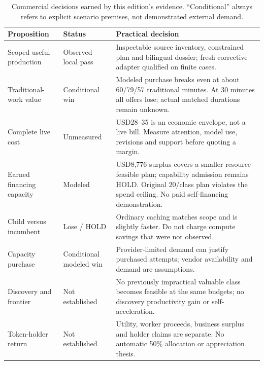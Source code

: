 \begin{table}[H]\small\begin{tabularx}{\linewidth}{p{.21\linewidth}p{.19\linewidth}X}\toprule Proposition & Status & Practical decision \\\midrule
Scoped useful production & Observed local pass & Inspectable source inventory, constrained plan and bilingual dossier; fresh corrective adapter qualified on finite cases. \\
Traditional-work value & Conditional win & Modeled purchase breaks even at about 60/79/57 traditional minutes. At 30 minutes all offers lose; actual matched durations remain unknown. \\
Complete live cost & Unmeasured & USD28--35 is an economic envelope, not a live bill. Measure attention, model use, revisions and support before quoting a margin. \\
Earned financing capacity & Modeled & USD8,776 surplus covers a smaller resource-feasible plan; capability admission remains HOLD. Original 20/class plan violates the spend ceiling. No paid self-financing demonstration. \\
Child versus incumbent & Lose / HOLD & Ordinary caching matches scope and is slightly faster. Do not charge compute savings that were not observed. \\
Capacity purchase & Conditional modeled win & Provider-limited demand can justify purchased attempts; vendor availability and demand are assumptions. \\
Discovery and frontier & Not established & No previously impractical valuable class becomes feasible at the same budgets; no discovery productivity gain or self-acceleration. \\
Token-holder return & Not established & Utility, worker proceeds, business surplus and holder claims are separate. No automatic 50\% allocation or appreciation thesis. \\\bottomrule\end{tabularx}
\caption{Commercial decisions earned by this edition's evidence. ``Conditional'' always refers to explicit scenario premises, not demonstrated external demand.}\end{table}
